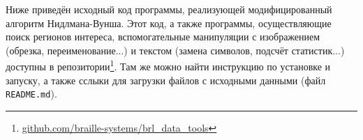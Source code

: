 \documentclass{main.tex}[subfiles]
\begin{document}

\newpage
{}
Ниже приведён исходный код программы, реализующей модифицированный алгоритм Нидлмана-Вунша. %
Этот код, а также программы, осуществляющие поиск регионов интереса, вспомогательные манипуляции с изображением (обрезка, переименование...) и текстом (замена символов, подсчёт статистик...) доступны в репозитории\footnote{\href{https://github.com/braille-systems/brl_data_tools}{github.com/braille-systems/brl\_data\_tools}}.
Там же можно найти инструкцию по установке и запуску, а также сслыки для загрузки файлов с исходными данными (файл \texttt{README.md}).


\end{document}
